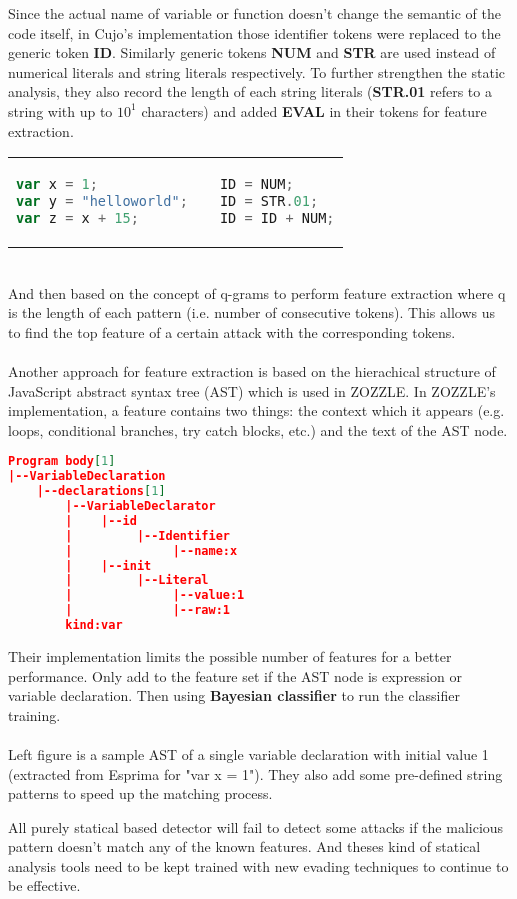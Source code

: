 \newpage
\noindent Since the actual name of variable or function doesn't change the semantic of the code itself, in Cujo\cite{Cujo}'s implementation those identifier tokens were replaced to the generic token \textbf{ID}. Similarly generic tokens \textbf{NUM} and \textbf{STR} are used instead of numerical literals and string literals respectively. To further strengthen the static analysis, they also record the length of each string literals (\textbf{STR.01} refers to a string with up to $10^1$ characters) and added \textbf{EVAL} in their tokens for feature extraction.   \\ 
\begin{tabular}{p{7cm}p{0.5cm}p{7cm}}
			\begin{lstlisting}[language=JavaScript, title=(original code)]
var x = 1;
var y = "helloworld";
var z = x + 15;
			\end{lstlisting} & & \begin{lstlisting}[language=JavaScript, title=(Cujo's implementation)]
ID = NUM;
ID = STR.01;
ID = ID + NUM;
			\end{lstlisting} 
	\end{tabular}  	 		
\\ 
And then based on the concept of q-grams to perform feature extraction where q is the length of each pattern (i.e. number of consecutive tokens). This allows us to find the top feature of a certain attack with the corresponding tokens.\\
\\
Another approach for feature extraction is based on the hierachical structure of JavaScript abstract syntax tree (AST) which is used in ZOZZLE\cite{ZOZZLE}. In ZOZZLE's implementation, a feature contains two things: the context which it appears (e.g. loops, conditional branches, try catch blocks, etc.) and the text of the AST node. 
\begin{multicols}{2}
\begin{lstlisting}[language=json,title=(AST from Esprima)]
Program body[1]
|--VariableDeclaration
    |--declarations[1]
		|--VariableDeclarator
		|	 |--id
		|		  |--Identifier
		|			   |--name:x
		|	 |--init
		|		  |--Literal
		|			   |--value:1
		|			   |--raw:1
		kind:var
	\end{lstlisting} 
Their implementation limits the possible number of features for a better performance. Only add to the feature set if the AST node is expression or variable declaration. Then using \textbf{Bayesian classifier} to run the classifier training.\\ \\ 
Left figure is a sample AST of a single variable declaration with initial value 1 (extracted from Esprima for "var x = 1"). They also add some pre-defined string patterns to speed up the matching process.
\end{multicols}
\noindent All purely statical based detector will fail to detect some attacks if the malicious pattern doesn't match any of the known features. And theses kind of statical analysis tools need to be kept trained with new evading techniques to continue to be effective.
\newpage
